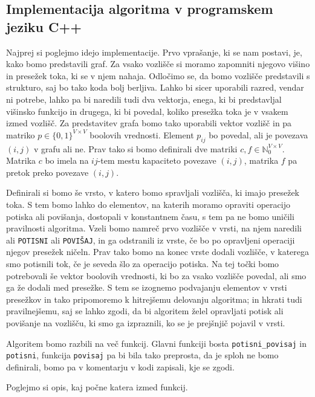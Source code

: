 \documentclass[mat1]{fmfdelo}
\newcommand{\N}{\mathbb N}
\begin{document}
\subsection{Implementacija algoritma v programskem jeziku C++}

Najprej si poglejmo idejo implementacije. Prvo vprašanje, ki se nam postavi, je, kako bomo predstavili graf. Za vsako vozlišče si moramo zapomniti njegovo višino in presežek toka, ki se v njem nahaja. Odločimo se, da bomo vozlišče predstavili s strukturo, saj bo tako koda bolj berljiva. Lahko bi sicer uporabili razred, vendar ni potrebe, lahko pa bi naredili tudi dva vektorja, enega, ki bi predstavljal višinsko funkcijo in drugega, ki bi povedal, koliko presežka toka je v vsakem izmed vozlišč. Za predstavitev grafa bomo tako uporabili vektor vozlišč in pa matriko $p\in \{0,1\}^{V \times V}$ boolovih vrednosti. Element $p_{ij}$ bo povedal, ali je povezava $(i,j)$ v grafu ali ne. Prav tako si bomo definirali dve matriki $c, f \in \N_0^{V \times V}$. Matrika $c$ bo imela na $ij$-tem mestu kapaciteto povezave $(i,j)$, matrika $f$ pa pretok preko povezave $(i,j)$.

Definirali si bomo še vrsto, v katero bomo spravljali vozlišča, ki imajo presežek toka. S tem bomo lahko do elementov, na katerih moramo opraviti operacijo potiska ali povišanja, dostopali v konstantnem času, s tem pa ne bomo uničili pravilnosti algoritma. Vzeli bomo namreč prvo vozlišče v vrsti, na njem naredili ali \texttt{POTISNI} ali \texttt{POVIŠAJ}, in ga odstranili iz vrste, če bo po opravljeni operaciji njegov presežek ničeln. Prav tako bomo na konec vrste dodali vozlišče, v katerega smo potisnili tok, če je seveda šlo za operacijo potiska. Na tej točki bomo potrebovali še vektor boolovih vrednosti, ki bo za vsako vozlišče povedal, ali smo ga že dodali med presežke. S tem se izognemo podvajanju elementov v vrsti presežkov in tako pripomoremo k hitrejšemu delovanju algoritma; in hkrati tudi pravilnejšemu, saj se lahko zgodi, da bi algoritem želel opravljati potisk ali povišanje na vozlišču, ki smo ga izpraznili, ko se je prejšnjič pojavil v vrsti.

Algoritem bomo razbili na več funkcij. Glavni funkciji bosta \texttt{potisni\_povisaj} in \texttt{potisni}, funkcija \texttt{povisaj} pa bi bila tako preprosta, da je sploh ne bomo definirali, bomo pa v komentarju v kodi zapisali, kje se zgodi.

Poglejmo si opis, kaj počne katera izmed funkcij.
\end{document}
